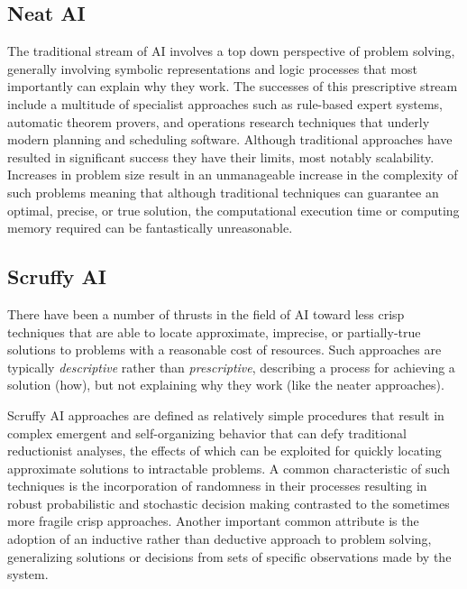 \documentclass[a4paper, 11pt]{article}
\begin{document}
\subsection{Neat AI}
The traditional stream of AI involves a top down perspective of problem solving, generally involving symbolic representations and logic processes that most importantly can explain why they work. The successes of this prescriptive stream include a multitude of specialist approaches such as rule-based expert systems, automatic theorem provers, and operations research techniques that underly modern planning and scheduling software. Although traditional approaches have resulted in significant success they have their limits, most notably scalability. Increases in problem size result in an unmanageable increase in the complexity of such problems meaning that although traditional techniques can guarantee an optimal, precise, or true solution, the computational execution time or computing memory required can be fantastically unreasonable.

\subsection{Scruffy AI}
There have been a number of thrusts in the field of AI toward less crisp techniques that are able to locate approximate, imprecise, or partially-true solutions to problems with a reasonable cost of resources. Such approaches are typically \emph{descriptive} rather than \emph{prescriptive}, describing a process for achieving a solution (how), but not explaining why they work (like the neater approaches). 

Scruffy AI approaches are defined as relatively simple procedures that result in complex emergent and self-organizing behavior that can defy traditional reductionist analyses, the effects of which can be exploited for quickly locating approximate solutions to intractable problems. A common characteristic of such techniques is the incorporation of randomness in their processes resulting in robust probabilistic and stochastic decision making contrasted to the sometimes more fragile crisp approaches. Another important common attribute is the adoption of an inductive rather than deductive approach to problem solving, generalizing solutions or decisions from sets of specific observations made by the system.

% 
% 
\end{document}
